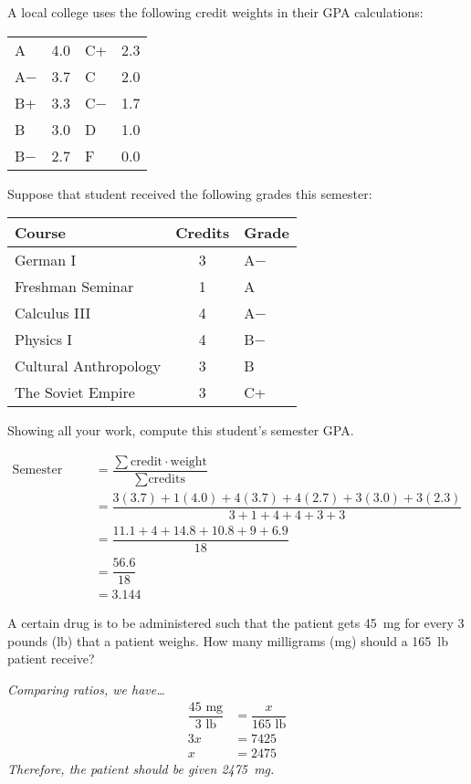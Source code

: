 \documentclass[12pt,letterpaper]{exam}
\begin{document}
\begin{questions}
\newpage
\question[10] A local college uses the following credit weights in their GPA calculations:
	\begin{table}[!ht]
	\centering
	\begin{tabular}{lr|lr}
	A & 4.0 & C+ & 2.3 \\
	A$-$ & 3.7 & C & 2.0 \\
	B+ & 3.3 & C$-$ & 1.7 \\
	B & 3.0 & D & 1.0 \\
	B$-$ & 2.7 & F & 0.0
	\end{tabular}
	\end{table} \par
Suppose that student received the following grades this semester:
	\begin{table}[!ht]
	\centering
	\begin{tabular}{lcl}
	Course & Credits & Grade \\ \hline
	German I & 3 & A$-$ \\
	Freshman Seminar & 1 & A \\
	Calculus III & 4 & A$-$ \\
	Physics I & 4 & B$-$ \\
	Cultural Anthropology & 3 & B \\
	The Soviet Empire & 3 & C+
	\end{tabular}
	\end{table} \par
Showing all your work, compute this student's semester GPA. \pspace

\sol 
	\[
	\begin{aligned}
	\text{Semester GPA}&= \dfrac{\sum \text{credit} \cdot \text{weight}}{\sum \text{credits}} \\[0.3cm]
	&= \dfrac{3(3.7) + 1(4.0) + 4(3.7) + 4(2.7) + 3(3.0) + 3(2.3)}{3 + 1 + 4 + 4 + 3 + 3} \\[0.3cm]
	&= \dfrac{11.1 + 4 + 14.8 + 10.8 + 9 + 6.9}{18} \\[0.3cm]
	&= \dfrac{56.6}{18} \\[0.3cm]
	&= 3.144
	\end{aligned}
	\]



\newpage
\question[10] A certain drug is to be administered such that the patient gets 45~mg for every 3 pounds (lb) that a patient weighs. How many milligrams (mg) should a 165~lb patient receive? \pspace

{\itshape Comparing ratios, we have\dots \pspace
	\[
	\begin{aligned}
	\dfrac{45 \text{ mg}}{3 \text{ lb}}&= \dfrac{x}{165 \text{ lb}} \\[0.3cm]
	3x&= 7425 \\[0.3cm]
	x&= 2475
	\end{aligned}
	\] \pspace
Therefore, the patient should be given 2475~mg. 
}




\end{questions}
\end{document}
